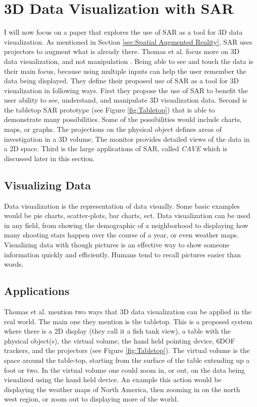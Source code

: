 \documentclass{sig-alternate}
\begin{document}
\section{3D Data Visualization with SAR}
\label{sec:3D Data Visualization}
I will now focus on a paper that explores the use of SAR as a tool for 3D data visualization. As mentioned in Section \ref{sec:Spatial Augmented Reality}, SAR uses projectors to augment what is already there. Thomas et al. focus more on 3D data visualization, and not manipulation \cite{3D}. Being able to see and touch the data is their main focus, because using multiple inputs can help the user remember the data being displayed. They define their proposed use of SAR as a tool for 3D visualization in following ways. First they propose the use of SAR to benefit the user ability to see, understand, and manipulate 3D visualization data. Second is the tabletop SAR prototype (see Figure \ref{fig:Tabletop}) that is able to demonstrate many possibilities. Some of the possibilities would include charts, maps, or graphs. The projections on the physical object defines areas of investigation in a 3D volume. The monitor provides detailed views of the data in a 2D space. Third is the large applications of SAR, called \textit{CAVE} which is discussed later in this section.

\subsection{Visualizing Data}
\label{sec:Visualizing Data}
Data visualization is the representation of data visually. Some basic examples would be pie charts, scatter-plots, bar charts, ect. Data visualization can be used in any field, from showing the demographic of a neighborhood to displaying how many shooting stars happen over the course of a year, or even weather maps. Visualizing data with though pictures is an effective way to show someone information quickly and efficiently. Humans tend to recall pictures easier than words.    

\subsection{Applications}
\label{sec:3D Applications}
Thomas et al. mention two ways that 3D data visualization can be applied in the real world. The main one they mention is the tabletop. This is a proposed system where there is a 2D display (they call it a fish tank view), a table with the physical object(s), the virtual volume, the hand held pointing device, 6DOF trackers, and the projectors (see Figure \ref{fig:Tabletop}). The virtual volume is the space around the table-top, starting from the surface of the table extending up a foot or two. In the virtual volume one could zoom in, or out, on the data being visualized using the hand held device. An example this action would be displaying the weather maps of North America, then zooming in on the north west region, or zoom out to displaying more of the world.  
\end{document}
